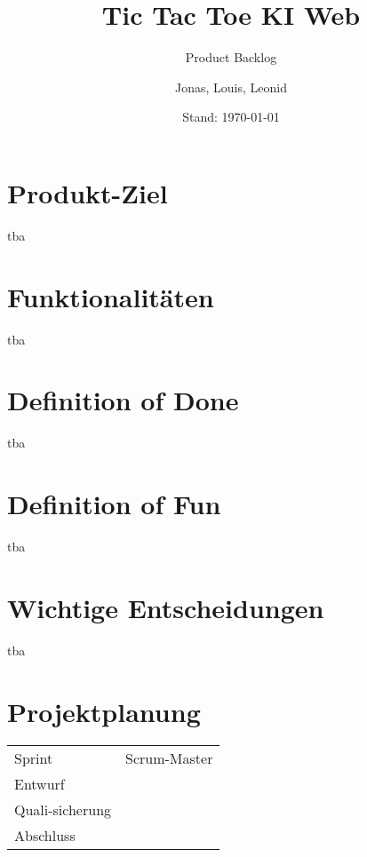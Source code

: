 \documentclass[titlepage]{scrartcl}
\title{Tic Tac Toe KI Web}
\subtitle{Product Backlog}
\date{Stand: \today}
\author{Jonas, Louis, Leonid}
\begin{document}
\maketitle

%

\section{Produkt-Ziel}%
tba
\section{Funktionalitäten}%
tba
\section{Definition of Done}%
tba
\section{Definition of Fun}%
tba
\section{Wichtige Entscheidungen}
tba
\section{Projektplanung}%
\begin{tabular}{lc}
	Sprint & Scrum-Master\\
	Entwurf & \\
	Quali-sicherung & \\
	Abschluss & \\
\end{tabular}
\end{document}
